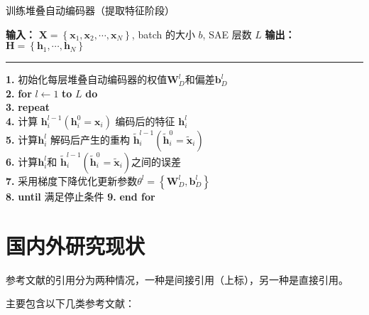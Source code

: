 \begin{algorithm}[htb]	
 	\caption{训练堆叠自动编码器（提取特征阶段）}\label{Algorithm1-1}
	\begin{algorithmic}
		\wuhao
		\STATE \textbf{输入：}
        $\boldsymbol{X}=\left\{\boldsymbol{x}_1, \boldsymbol{x}_2, \cdots, \boldsymbol{x}_N\right\}$, batch 的大小 $b$, SAE 层数 $L$
        \STATE \textbf{输出：}	
         $\boldsymbol{H}=\left\{\boldsymbol{h}_1, \cdots, \boldsymbol{h}_N\right\}$ \\
        \vspace{0.3em}
        \hrule	
        \vspace{0.3em}		
        \STATE \textbf{1. }	
		初始化每层堆叠自动编码器的权值$\boldsymbol{W}_D^l$和偏差$\boldsymbol{b}_D^l$\\
        \STATE \textbf{2. }
        \textbf { for } $l \leftarrow 1$ \textbf { to } $L$ \textbf { do } \\
        \STATE \textbf{3. }
        \textbf { repeat} \\
        \STATE \textbf{4. }
        计算 $\boldsymbol{h}_i^{l-1}\left(\boldsymbol{h}_i^0=\boldsymbol{x}_i\right)$ 编码后的特征 $\boldsymbol{h}_i^l$ \\
        \STATE \textbf{5. }
        计算$\boldsymbol{h}_i^l$ 解码后产生的重构 $\tilde{\boldsymbol{h}}_i^{l-1}\left(\tilde{\boldsymbol{h}}_i^0=\tilde{\boldsymbol{x}}_i\right)$ \\
        \STATE \textbf{6. }
        计算$\boldsymbol{h}_i^l$和 $\tilde{\boldsymbol{h}}_i^{l-1}\left(\tilde{\boldsymbol{h}}_i^0=\tilde{\boldsymbol{x}}_i\right)$之间的误差  \\
        \STATE \textbf{7. }
        采用梯度下降优化更新参数$\theta^l=\left\{\boldsymbol{W}_D^l, \boldsymbol{b}_D^l\right\}$ \\
        \STATE \textbf{8. }
        \textbf {until} 满足停止条件 
        \STATE \textbf{9. }
        \textbf {end for}
	\end{algorithmic}
\end{algorithm}



\section{国内外研究现状}

参考文献的引用分为两种情况，一种是间接引用（上标）\cite{2004-David-Order}，另一种是直接引用。


主要包含以下几类参考文献：

